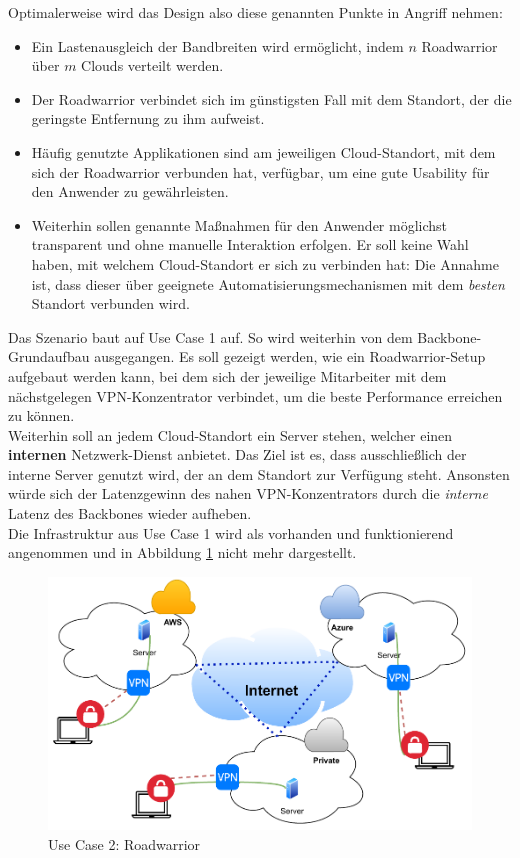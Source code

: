 Optimalerweise wird das Design also diese genannten Punkte in Angriff nehmen:
\begin{itemize}
\item Ein Lastenausgleich der Bandbreiten wird ermöglicht, indem $n$ \gls{Roadwarrior} über $m$ Clouds verteilt werden.
\item Der \gls{Roadwarrior} verbindet sich im günstigsten Fall mit dem Standort, der die geringste Entfernung zu ihm aufweist.
\item Häufig genutzte Applikationen sind am jeweiligen Cloud-Standort, mit dem sich der \gls{Roadwarrior} verbunden hat, verfügbar, um eine gute Usability für den Anwender zu gewährleisten.
\item Weiterhin sollen genannte Maßnahmen für den Anwender möglichst transparent und ohne manuelle Interaktion erfolgen. Er soll keine Wahl haben, mit welchem Cloud-Standort er sich zu verbinden hat: Die Annahme ist, dass dieser über geeignete Automatisierungsmechanismen mit dem \textit{besten} Standort verbunden wird.
\end{itemize}
Das Szenario baut auf Use Case 1 auf. So wird weiterhin von dem Backbone-Grundaufbau ausgegangen. Es soll gezeigt werden, wie ein \gls{Roadwarrior}-Setup aufgebaut werden kann, bei dem sich der jeweilige Mitarbeiter mit dem nächstgelegen \gls{VPN-Konzentrator} verbindet, um die beste Performance erreichen zu können.\\
Weiterhin soll an jedem Cloud-Standort ein Server stehen, welcher einen \textbf{internen} Netzwerk-Dienst anbietet. Das Ziel ist es, dass ausschließlich der interne Server genutzt wird, der an dem Standort zur Verfügung steht. Ansonsten würde sich der Latenzgewinn des nahen \gls{VPN-Konzentrator}s durch die \textit{interne} Latenz des Backbones wieder aufheben.\\
Die Infrastruktur aus Use Case 1 wird als vorhanden und funktionierend angenommen und in Abbildung \ref{grafik:Use-Case-2_Vereinfacht} nicht mehr dargestellt.
\begin{figure}[h]
  \centering
  \includegraphics[scale=0.75]{Figures/Use-Case_2_Vereinfacht_1.pdf}
  \caption{Use Case 2: Roadwarrior}
  \label{grafik:Use-Case-2_Vereinfacht}
\end{figure}\FloatBarrier

